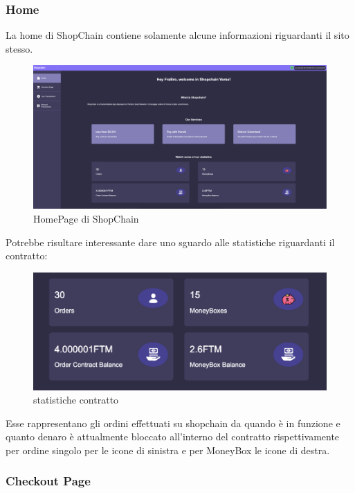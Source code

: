         \subsubsection{Home}
        La home di ShopChain contiene solamente alcune informazioni riguardanti il sito stesso.
        \begin{figure}[H]
            \centering
            \includegraphics[scale=0.2]{immagini/Home.png}
            \caption{HomePage di ShopChain}
        \end{figure}
        Potrebbe risultare interessante dare uno sguardo alle statistiche riguardanti il contratto:
        \begin{figure}[H]
            \centering
            \includegraphics[scale=0.4]{immagini/ContractDetails.png}
            \caption{statistiche contratto}
        \end{figure}

        Esse rappresentano gli ordini effettuati su shopchain da quando è in funzione e quanto denaro è attualmente bloccato all'interno del contratto rispettivamente per ordine singolo per le icone di sinistra e per MoneyBox le icone di destra.

        \subsubsection{Checkout Page}

